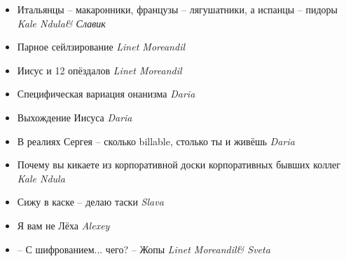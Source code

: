 \documentclass[11pt]{book}
\newcommand{\entry}[2] {\large{\textmd{#1}} \textemdash \small{\emph{#2}}}
\newcommand{\kn}{Kale Ndula}
\newcommand{\lm}{Linet Moreandil}
\newcommand{\al}{Alexey}
\newcommand{\sv}{Sveta}
\begin{document}
\begin{itemize}[leftmargin=0cm]
\item \entry{Итальянцы -- макаронники, французы -- лягушатники, а испанцы -- пидоры}{\kn \& Славик}
\item \entry{Парное сейлзирование}{\lm}
\item \entry{Иисус и 12 опёздалов}{\lm}
\item \entry{Специфическая вариация онанизма}{Daria}
\item \entry{Выхождение Иисуса}{Daria}
\item \entry{В реалиях Сергея -- сколько billable, столько ты и живёшь}{Daria}
\item \entry{Почему вы кикаете из корпоративной доски корпоративных бывших коллег}{\kn}
\item \entry{Сижу в каске -- делаю таски}{Slava}
\item \entry{Я вам не Лёха}{\al}
\item \entry{-- С шифрованием... чего? -- Жопы}{\lm & \sv}

\end{itemize}
\end{document}
